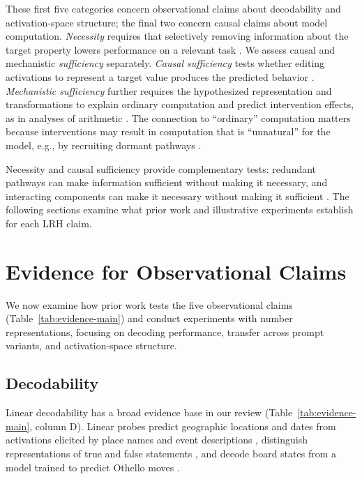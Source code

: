 \documentclass[11pt]{article}
\begin{document}
These first five categories concern observational claims about decodability and activation-space structure; the final two concern causal claims about model computation.
\emph{Necessity} requires that selectively removing information about the target property lowers performance on a relevant task \citep[Sec.~3.2]{harding2023operationalising}.
We assess causal and mechanistic \emph{sufficiency} separately.
\emph{Causal sufficiency} tests whether editing activations to represent a target value produces the predicted behavior \citep{heimersheim2024patching}.
\emph{Mechanistic sufficiency} further requires the hypothesized representation and transformations to explain ordinary computation and predict intervention effects, as in analyses of arithmetic \citep{zhou2024fourier,kantamneni2025trigonometry,feucht2026arithmetic}.
The connection to ``ordinary'' computation matters because interventions may result in computation that is ``unnatural'' for the model, e.g., by recruiting dormant pathways \citep{makelov2023subspace}.

Necessity and causal sufficiency provide complementary tests: redundant pathways can make information sufficient without making it necessary, and interacting components can make it necessary without making it sufficient \citep{heimersheim2024patching}.
The following sections examine what prior work and illustrative experiments establish for each LRH claim.

\section{Evidence for Observational Claims}
\label{sec:weak-lrh}

We now examine how prior work tests the five observational claims (Table~\ref{tab:evidence-main}) and conduct experiments with number representations, focusing on decoding performance, transfer across prompt variants, and activation-space structure.

\subsection{Decodability}
\label{sec:decodability}

Linear decodability has a broad evidence base in our review (Table~\ref{tab:evidence-main}, column D).
Linear probes predict geographic locations and dates from activations elicited by place names and event descriptions \citep{gurnee2023language}, distinguish representations of true and false statements \citep{marks2024geometry}, and decode board states from a model trained to predict Othello moves \citep{nanda2023emergent}.
\end{document}
